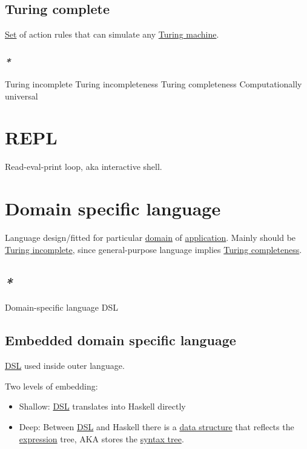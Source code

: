 \documentclass[a4paper,14pt,oneside]{book}
\begin{document}
\subsection{\label{org8bd568d}Turing complete}
\label{sec:org1c21df0}

\hyperref[org6aef0c5]{Set} of action rules that can simulate any \hyperref[org1c13f5b]{Turing machine}.

\subsubsection{\emph{*}}
\label{sec:orgbd89160}

\label{org4229efd}Turing incomplete
\label{orgb2a8bc3}Turing incompleteness
\label{org37fbdee}Turing completeness
\label{org8ba9340}Computationally universal

\section{\label{org2265555}REPL}
\label{sec:org20a9180}
Read-eval-print loop, aka interactive shell.

\section{\label{orgbcec7b3}Domain specific language}
\label{sec:org9a0b5df}
Language design/fitted for particular \hyperref[orga4604c0]{domain} of \hyperref[org72d155a]{application}. Mainly should be \hyperref[org4229efd]{Turing incomplete}, since general-purpose language implies \hyperref[org37fbdee]{Turing completeness}.

\subsection{\emph{*}}
\label{sec:org6296afb}

\label{orge24737e}Domain-specific language
\label{org0e4ca50}DSL

\subsection{\label{org4a84497}Embedded domain specific language}
\label{sec:org5723f6d}

\hyperref[org0e4ca50]{DSL} used inside outer language.

Two levels of embedding:

\begin{itemize}
\item Shallow: \hyperref[org0e4ca50]{DSL} translates into Haskell directly
\item Deep: Between \hyperref[org0e4ca50]{DSL} and Haskell there is a \hyperref[orgfb47f6b]{data structure} that reflects the \hyperref[org755d8b0]{expression} tree, AKA stores the \hyperref[org1dd619e]{syntax tree}.
\end{itemize}
\end{document}
